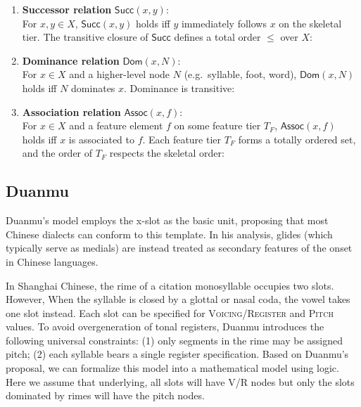 \documentclass[11pt]{article}
\begin{document}
\begin{enumerate}
	\item \textbf{Successor relation} $\mathsf{Succ}(x,y)$: \\
	For $x,y \in X$, $\mathsf{Succ}(x,y)$ holds iff $y$ immediately follows $x$ on the skeletal tier. 
	The transitive closure of $\mathsf{Succ}$ defines a total order $\leq$ over $X$:
	
	\item \textbf{Dominance relation} $\mathsf{Dom}(x,N)$: \\
	For $x \in X$ and a higher-level node $N$ (e.g.\ syllable, foot, word), 
	$\mathsf{Dom}(x,N)$ holds iff $N$ dominates $x$. 
	Dominance is transitive:
	
	\item \textbf{Association relation} $\mathsf{Assoc}(x,f)$: \\
	For $x \in X$ and a feature element $f$ on some feature tier $T_F$, 
	$\mathsf{Assoc}(x,f)$ holds iff $x$ is associated to $f$. 
	Each feature tier $T_F$ forms a totally ordered set, and the order of $T_F$ 
	respects the skeletal order:
\end{enumerate}


\subsection{Duanmu}
Duanmu’s model employs the x-slot as the basic unit, proposing that most Chinese 
dialects can conform to this template. In his analysis, glides (which typically 
serve as medials) are instead treated as secondary features of the onset in Chinese languages. 

In Shanghai Chinese, the rime of a citation monosyllable occupies two slots. However, 
When the syllable is closed by a glottal or nasal coda, the vowel takes one slot instead. 
Each slot can be specified for \textsc{Voicing/Register} and \textsc{Pitch} values. 
To avoid overgeneration of tonal registers, Duanmu introduces the following universal 
constraints: (1) only segments in the rime may be assigned pitch; (2) each syllable 
bears a single register specification. Based on Duanmu's proposal, we can formalize this model into a mathematical model using 
logic. Here we assume that underlying, all slots will have V/R nodes but only the slots
dominated by rimes will have the pitch nodes.
\end{document}
